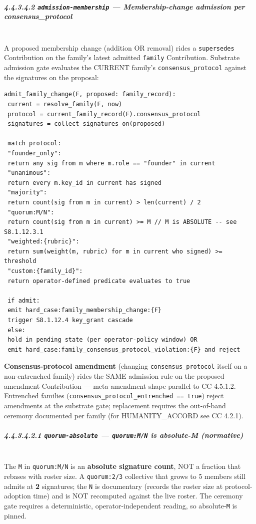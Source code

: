 \documentclass[11pt]{article}
\begin{document}
\subparagraph{4.4.3.4.2 \texttt{admission-membership} — Membership-change admission per consensus\_protocol}\mbox{}\\


A proposed membership change (addition OR removal) rides a \texttt{supersedes} Contribution on the family's latest admitted \texttt{family} Contribution. Substrate admission gate evaluates the CURRENT family's \texttt{consensus\_protocol} against the signatures on the proposal:


\begin{lstlisting}
admit_family_change(F, proposed: family_record):
 current = resolve_family(F, now)
 protocol = current_family_record(F).consensus_protocol
 signatures = collect_signatures_on(proposed)

 match protocol:
 "founder_only":
 return any sig from m where m.role == "founder" in current
 "unanimous":
 return every m.key_id in current has signed
 "majority":
 return count(sig from m in current) > len(current) / 2
 "quorum:M/N":
 return count(sig from m in current) >= M // M is ABSOLUTE -- see S8.1.12.3.1
 "weighted:{rubric}":
 return sum(weight(m, rubric) for m in current who signed) >= threshold
 "custom:{family_id}":
 return operator-defined predicate evaluates to true

 if admit:
 emit hard_case:family_membership_change:{F}
 trigger S8.1.12.4 key_grant cascade
 else:
 hold in pending state (per operator-policy window) OR
 emit hard_case:family_consensus_protocol_violation:{F} and reject
\end{lstlisting}

\textbf{Consensus-protocol amendment} (changing \texttt{consensus\_protocol} itself on a non-entrenched family) rides the SAME admission rule on the proposed amendment Contribution — meta-amendment shape parallel to CC 4.5.1.2. Entrenched families (\texttt{consensus\_protocol\_entrenched == true}) reject amendments at the substrate gate; replacement requires the out-of-band ceremony documented per family (for HUMANITY\_ACCORD see CC 4.2.1).


\subparagraph{4.4.3.4.2.1 \texttt{quorum-absolute} — \texttt{quorum:M/N} is absolute-M (normative)}\mbox{}\\


The \texttt{M} in \texttt{quorum:M/N} is an \textbf{absolute signature count}, NOT a fraction that rebases with roster size. A \texttt{quorum:2/3} collective that grows to 5 members still admits at \textbf{2} signatures; the \texttt{N} is documentary (records the roster size at protocol-adoption time) and is NOT recomputed against the live roster. The ceremony gate requires a deterministic, operator-independent reading, so absolute-\texttt{M} is pinned.
\end{document}
